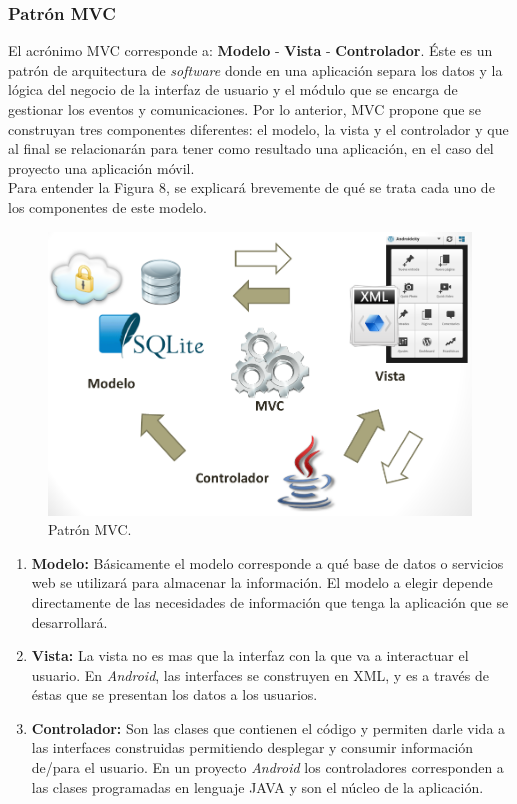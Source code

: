 \subsubsection{Patrón MVC}

El acrónimo MVC corresponde a: \textbf{Modelo} - \textbf{Vista} - \textbf{Controlador}. Éste es un patrón de arquitectura de \textit{software} donde en una aplicación separa los datos y la lógica del negocio de la interfaz de usuario y el módulo que se encarga de gestionar los eventos y comunicaciones. Por lo anterior, MVC propone que se construyan tres componentes diferentes: el modelo, la vista y el controlador y que al final se relacionarán para tener como resultado una aplicación, en el caso del proyecto una aplicación móvil.\\ 

Para entender la Figura 8, se explicará brevemente de qué se trata cada uno de los componentes de este modelo.\\

\begin{figure}[H]
\centering
\includegraphics[scale=0.50]{images/capitulo3/mvc.png}
\caption{Patrón MVC.\cite{And12}}
\label{valor}
\end{figure}

\begin{enumerate}
\item \textbf{Modelo:} Básicamente el modelo corresponde a qué base de datos o servicios web se utilizará para almacenar la información. El modelo a elegir depende directamente de las necesidades de información que tenga la aplicación que se desarrollará.
\item \textbf{Vista:} La vista no es mas que la interfaz con la que va a interactuar el usuario. En \textit{Android}, las interfaces se construyen en XML, y es a través de éstas que se presentan los datos a los usuarios.
\item \textbf{Controlador:} Son las clases que contienen el código y permiten darle vida a las interfaces construidas permitiendo desplegar y consumir información de/para el usuario. En un proyecto \textit{Android} los controladores corresponden a las clases programadas en lenguaje JAVA y son el núcleo de la aplicación.
\end{enumerate}

